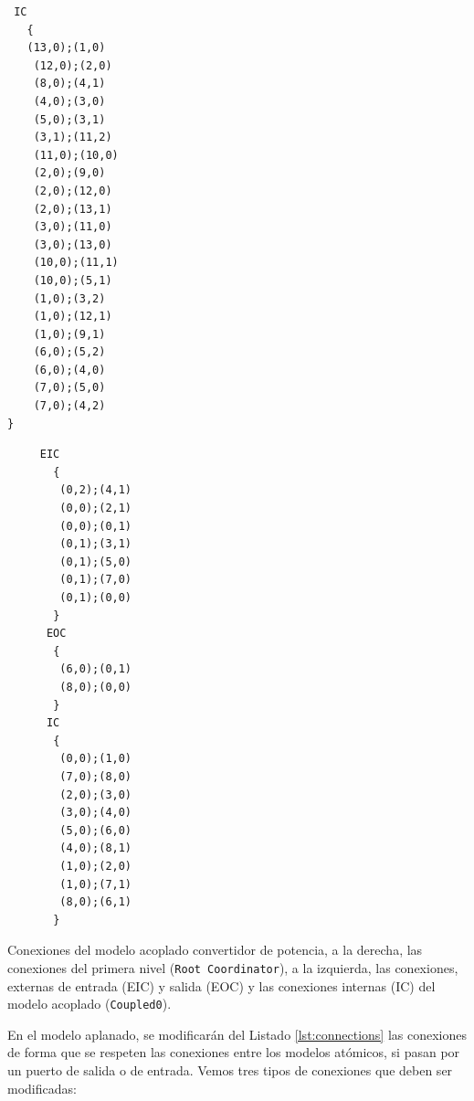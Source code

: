 \begin{listing}
\begin{minipage}[t]{0.5\linewidth}
\centering
\begin{verbatim}
 IC
   {
   (13,0);(1,0)
    (12,0);(2,0)
    (8,0);(4,1)
    (4,0);(3,0)
    (5,0);(3,1)
    (3,1);(11,2)
    (11,0);(10,0)
    (2,0);(9,0)
    (2,0);(12,0)
    (2,0);(13,1)
    (3,0);(11,0)
    (3,0);(13,0)
    (10,0);(11,1)
    (10,0);(5,1)
    (1,0);(3,2)
    (1,0);(12,1)
    (1,0);(9,1)
    (6,0);(5,2)
    (6,0);(4,0)
    (7,0);(5,0)
    (7,0);(4,2)
}
\end{verbatim}
\end{minipage}
\begin{minipage}[t]{0.5\linewidth}
\begin{verbatim}
     EIC
       {
        (0,2);(4,1)
        (0,0);(2,1)
        (0,0);(0,1)
        (0,1);(3,1)
        (0,1);(5,0)
        (0,1);(7,0)
        (0,1);(0,0)
       }
      EOC
       {
        (6,0);(0,1)
        (8,0);(0,0)
       }
      IC
       {
        (0,0);(1,0)
        (7,0);(8,0)
        (2,0);(3,0)
        (3,0);(4,0)
        (5,0);(6,0)
        (4,0);(8,1)
        (1,0);(2,0)
        (1,0);(7,1)
        (8,0);(6,1)
       }
\end{verbatim}
\end{minipage}
\caption{Conexiones del modelo acoplado convertidor de potencia, a la derecha, las conexiones del primera nivel (\texttt{Root Coordinator}), a la izquierda, 
        las conexiones, externas de entrada (EIC) y salida (EOC) y las conexiones internas (IC) del modelo acoplado (\texttt{Coupled0}).}\label{lst:connections}
\end{listing}

        En el modelo aplanado, se modificarán del Listado \ref{lst:connections} las conexiones de forma que se respeten las conexiones entre los modelos atómicos, 
	si pasan por un puerto de salida o de entrada. Vemos tres tipos de conexiones que deben ser modificadas:

